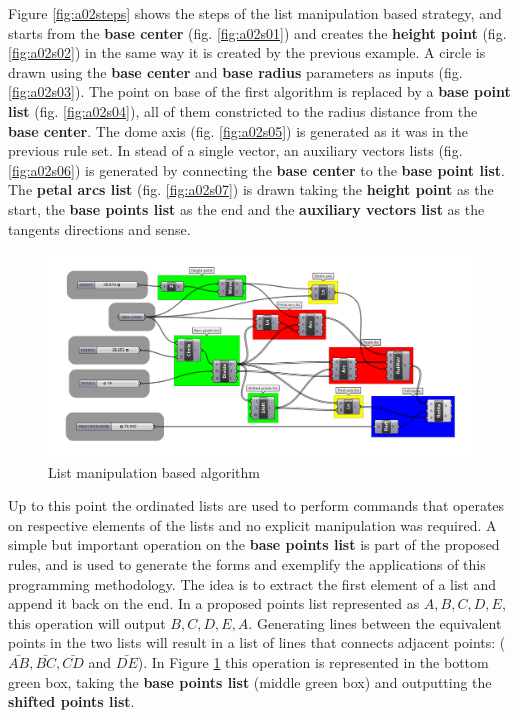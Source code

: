 \documentclass[preprint,12pt,3p]{elsarticle}
\begin{document}
Figure \ref{fig:a02steps} shows the steps of the list manipulation based strategy, and starts from the \textbf{base center} (fig. \ref{fig:a02s01}) and creates the \textbf{height point} (fig. \ref{fig:a02s02}) in the same way it is created by the previous example. A circle is drawn using the \textbf{base center} and \textbf{base radius} parameters as inputs (fig. \ref{fig:a02s03}). The point on base of the first algorithm is replaced by a \textbf{base point list} (fig. \ref{fig:a02s04}), all of them constricted to the radius distance from the \textbf{base center}. The dome axis (fig. \ref{fig:a02s05}) is generated as it was in the previous rule set. In stead of a single vector, an auxiliary vectors lists (fig. \ref{fig:a02s06}) is generated by connecting the \textbf{base center} to the \textbf{base point list}. The \textbf{petal arcs list} (fig. \ref{fig:a02s07}) is drawn taking the \textbf{height point} as the start, the \textbf{base points list} as the end and the \textbf{auxiliary vectors list} as the tangents directions and sense.

\begin{figure}[!h]
\begin{center}
\includegraphics[width=0.95
\textwidth]{alg02.png}
\caption{List manipulation based algorithm}
\label{figura:alg02}
\end{center}
\end{figure}

Up to this point the ordinated lists are used to perform commands that operates on respective elements of the lists and no explicit manipulation was required. A simple but important operation on the \textbf{base points list} is part of the proposed rules, and is used to generate the forms and exemplify the applications of this programming methodology. The idea is to extract the first element of a list and append it back on the end. In a proposed points list represented as $A, B, C, D, E$, this operation will output $B, C, D, E, A$. Generating lines between the equivalent points in the two lists will result in a list of lines that connects adjacent points: ($\bar{AB}, \bar{BC}, \bar{CD}$ and $\bar{DE}$). In Figure \ref{figura:alg02} this operation is represented in the bottom green box, taking the \textbf{base points list} (middle green box) and outputting the \textbf{shifted points list}.
\end{document}
